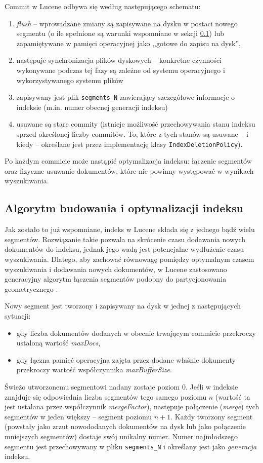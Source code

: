 Commit w Lucene odbywa się według następującego schematu:
\begin{enumerate}
 \item \emph{flush} -- wprowadzane zmiany są zapisywane na dysku w postaci nowego segmentu (o ile spełnione są warunki wspomniane w sekcji \ref{sec:segments}) lub zapamiętywane w pamięci operacyjnej jako ,,gotowe do zapisu na dysk'',
 \item następuje synchronizacja plików dyskowych -- konkretne czynności wykonywane podczas tej fazy są zależne od systemu operacyjnego i wykorzystywanego systemu plików
 \item zapisywany jest plik \texttt{segments\_N} zawierający szczegółowe informacje o indeksie (m.in. numer obecnej generacji indeksu)
 \item usuwane są stare commity (istnieje możliwość przechowywania stanu indeksu sprzed określonej liczby commitów. To, które z tych stanów są usuwane -- i kiedy -- określane jest przez implementację klasy \texttt{IndexDeletionPolicy}).
\end{enumerate}

Po każdym commicie może nastąpić optymalizacja indeksu: łączenie segmentów oraz fizyczne usuwanie dokumentów, które nie powinny występować w wynikach wyszukiwania.

\subsection{Algorytm budowania i optymalizacji indeksu}
\label{sec:segments}

Jak zostało to już wspomniane, indeks w Lucene składa się z jednego bądź wielu segmentów. Rozwiązanie takie pozwala na skrócenie czasu dodawania nowych dokumentów do indeksu, jednak jego wadą jest potencjalne wydłużenie czasu wyszukiwania. Dlatego, aby zachować równowagę pomiędzy optymalnym czasem wyszukiwania i dodawania nowych dokumentów, w Lucene zastosowano generacyjny algorytm łączenia segmentów podobny do partycjonowania geometrycznego \cite{geopart}. 

Nowy segment jest tworzony i zapisywany na dysk w jednej z następujących sytuacji:
\begin{itemize}
 \item gdy liczba dokumentów dodanych w obecnie trwającym commicie przekroczy ustaloną wartość \emph{maxDocs},
 \item gdy łączna pamięć operacyjna zajęta przez dodane właśnie dokumenty przekroczy wartość współczynnika \emph{maxBufferSize}.
\end{itemize}
Świeżo utworzonemu segmentowi nadany zostaje poziom 0. Jeśli w indeksie znajduje się odpowiednia liczba segmentów tego samego poziomu $n$ (wartość ta jest ustalana przez współczynnik \emph{mergeFactor}), następuje połączenie (\emph{merge}) tych segmentów w jeden większy -- segment poziomu $n+1$. Każdy tworzony segment (powstały jako zrzut nowododanych dokumentów na dysk lub jako połączenie mniejszych segmentów) dostaje swój unikalny numer. Numer najmłodszego segmentu jest przechowywany w pliku \texttt{segments\_N} i określany jest jako \emph{generacja} indeksu.

